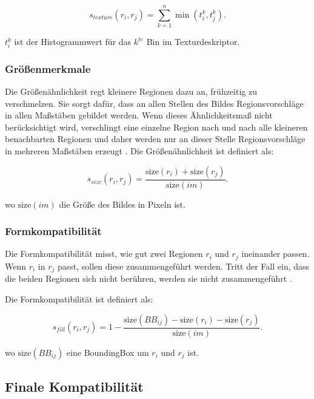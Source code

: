 \begin{equation}
	s_{texture}(r_{i},r_{j}) = \sum_{k=1}^{n} \min(t_{i}^k,t_{j}^k).
\end{equation}

$t^k_i$ ist der Histogrammwert für das $k^{te}$ Bin im Texturdeskriptor.

\subsubsection*{Größenmerkmale}

Die Größenähnlichkeit regt kleinere Regionen dazu an, frühzeitig zu verschmelzen. Sie sorgt dafür, dass an allen Stellen des Bildes Regionsvorschläge in allen Maßstäben gebildet werden. Wenn dieses Ähnlichkeitsmaß nicht berücksichtigt wird, verschlingt eine einzelne Region nach und nach alle kleineren benachbarten Regionen und daher werden nur an dieser Stelle Regionsvorschläge in mehreren Maßstäben erzeugt \cite{learnopencv}. Die Größenähnlichkeit ist definiert als:

\begin{equation}
	s_{size}(r_{i},r_{j}) = \frac{\text{size}(r_i) + \text{size}(r_j)}{\text{size}(im)}.
\end{equation}

wo $\text{size}(im)$ die Größe des Bildes in Pixeln ist.

\subsubsection*{Formkompatibilität}

Die Formkompatibilität misst, wie gut zwei Regionen $r_i$ und $r_j$ ineinander passen. Wenn $r_i$ in $r_j$ passt, sollen diese zusammengeführt werden. Tritt der Fall ein, dass die beiden Regionen sich nicht berühren, werden sie nicht zusammengeführt \cite{learnopencv}. 

Die Formkompatibilität ist definiert als:

\begin{equation}
	s_{fill}(r_{i},r_{j}) = 1 - \frac{\text{size}(BB_{ij}) - \text{size}(r_i) - \text{size}(r_j)}{\text{size}(im)}.
\end{equation}

wo $\text{size}(BB_{ij})$ eine \gls{BoundingBox} um $r_i$ und $r_j$ ist. 

\subsection*{Finale Kompatibilität}


